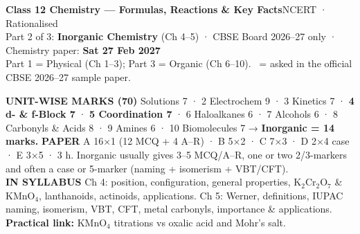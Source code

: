 \documentclass[9pt,a4paper]{extarticle}
\begin{document}
\footnotesize

\begin{tcolorbox}[enhanced,colback=navy,colframe=navy,arc=2pt,left=6pt,right=6pt,top=3pt,bottom=3pt]
\color{white}\sffamily
{\Large\bfseries Class 12 Chemistry — Formulas, Reactions \& Key Facts}\hfill{\small NCERT · Rationalised}\\[1pt]
{\footnotesize Part 2 of 3: \textbf{Inorganic Chemistry} (Ch 4--5) \;·\; CBSE Board 2026--27 only \;·\; Chemistry paper: \textbf{Sat 27 Feb 2027}}\\[2pt]
{\scriptsize Part 1 = Physical (Ch 1--3); Part 3 = Organic (Ch 6--10). \SQP\ = asked in the official CBSE 2026--27 sample paper.}
\end{tcolorbox}
\vspace{-1pt}
\noindent
\begin{tcolorbox}[enhanced,colback=navy!4,colframe=navy!60,boxrule=0.5pt,arc=1.5pt,left=3pt,right=3pt,top=1pt,bottom=1pt]
\scriptsize\sffamily\textbf{UNIT-WISE MARKS (70)}\rmfamily{} Solutions 7 · 2 Electrochem 9 · 3 Kinetics 7 · \textbf{\textcolor{uIV}{4 d- \& f-Block 7}} · \textbf{\textcolor{uV}{5 Coordination 7}} · 6 Haloalkanes 6 · 7 Alcohols 6 · 8 Carbonyls \& Acids 8 · 9 Amines 6 · 10 Biomolecules 7
\;→\; \textbf{Inorganic = 14 marks.}\quad
\sffamily\textbf{PAPER}\rmfamily\; A 16×1 (12 MCQ + 4 A--R) · B 5×2 · C 7×3 · D 2×4 case · E 3×5 · 3 h. Inorganic usually gives 3--5 MCQ/A--R, one or two 2/3-markers and often a case or 5-marker (naming + isomerism + VBT/CFT).\\
\sffamily\textbf{IN SYLLABUS}\rmfamily\; Ch 4: position, configuration, general properties, K$_2$Cr$_2$O$_7$ \& KMnO$_4$, lanthanoids, actinoids, applications. Ch 5: Werner, definitions, IUPAC naming, isomerism, VBT, CFT, metal carbonyls, importance \& applications. \textbf{Practical link:} KMnO$_4$ titrations vs oxalic acid and Mohr's salt.
\end{tcolorbox}
\end{document}
